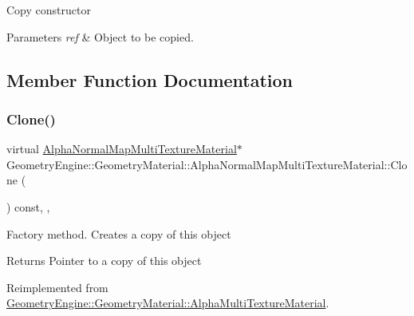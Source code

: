 Copy constructor 
\begin{DoxyParams}{Parameters}
{\em ref} & Object to be copied. \\
\hline
\end{DoxyParams}


\subsection{Member Function Documentation}
\mbox{\label{class_geometry_engine_1_1_geometry_material_1_1_alpha_normal_map_multi_texture_material_afa328c24595fe1456e87db7ad6df2759}} 
\subsubsection{\texorpdfstring{Clone()}{Clone()}}
{\footnotesize\ttfamily virtual \mbox{\hyperlink{class_geometry_engine_1_1_geometry_material_1_1_alpha_normal_map_multi_texture_material}{Alpha\+Normal\+Map\+Multi\+Texture\+Material}}$\ast$ Geometry\+Engine\+::\+Geometry\+Material\+::\+Alpha\+Normal\+Map\+Multi\+Texture\+Material\+::\+Clone (\begin{DoxyParamCaption}{ }\end{DoxyParamCaption}) const\hspace{0.3cm}{\ttfamily [inline]}, {\ttfamily [override]}, {\ttfamily [virtual]}}

Factory method. Creates a copy of this object \begin{DoxyReturn}{Returns}
Pointer to a copy of this object 
\end{DoxyReturn}


Reimplemented from \mbox{\hyperlink{class_geometry_engine_1_1_geometry_material_1_1_alpha_multi_texture_material_af31339a285fdf6180fe933f9c2f9ba16}{Geometry\+Engine\+::\+Geometry\+Material\+::\+Alpha\+Multi\+Texture\+Material}}.

\mbox{\label{class_geometry_engine_1_1_geometry_material_1_1_alpha_normal_map_multi_texture_material_a5d221c020a7f96d7fbc8368d5113d06f}} 
